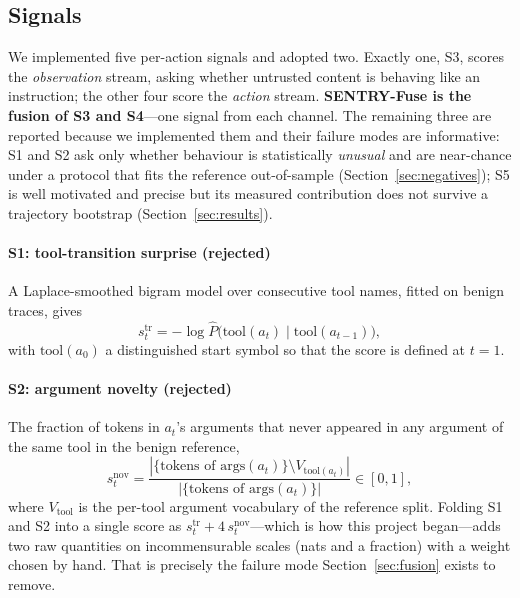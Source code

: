 \documentclass[preprint,12pt,authoryear]{elsarticle}
\theoremstyle{definition}
\begin{document}
\subsection{Signals}\label{sec:signals}

We implemented five per-action signals and adopted two. Exactly one, S3, scores the
\emph{observation} stream, asking whether untrusted content is behaving like an
instruction; the other four score the \emph{action} stream.
\textbf{SENTRY-Fuse is the fusion of S3 and S4}---one signal from each channel.
The remaining three are reported because we implemented them and their failure
modes are informative: S1 and S2 ask only whether behaviour is statistically \emph{unusual}
and are near-chance under a protocol that fits the reference out-of-sample
(Section~\ref{sec:negatives}); S5 is well motivated and precise but its measured
contribution does not survive a trajectory bootstrap (Section~\ref{sec:results}).

\paragraph{S1: tool-transition surprise (rejected)}
A Laplace-smoothed bigram model over consecutive tool names, fitted on benign
traces, gives
\begin{equation}
s^{\mathrm{tr}}_t = -\log \hat{P}\big(\mathrm{tool}(a_t) \mid \mathrm{tool}(a_{t-1})\big),
\end{equation}
with $\mathrm{tool}(a_0)$ a distinguished start symbol so that the score is
defined at $t=1$.

\paragraph{S2: argument novelty (rejected)}
The fraction of tokens in $a_t$'s arguments that never appeared in any argument of
the same tool in the benign reference,
\begin{equation}
s^{\mathrm{nov}}_t = \frac{|\{\text{tokens of } \mathrm{args}(a_t)\} \setminus
V_{\mathrm{tool}(a_t)}|}{|\{\text{tokens of } \mathrm{args}(a_t)\}|} \in [0,1],
\end{equation}
where $V_{\mathrm{tool}}$ is the per-tool argument vocabulary of the reference
split. Folding S1 and S2 into a single score as
$s^{\mathrm{tr}}_t + 4\,s^{\mathrm{nov}}_t$---which is how this project began---adds
two raw quantities on incommensurable scales (nats and a fraction) with a weight
chosen by hand. That
is precisely the failure mode Section~\ref{sec:fusion} exists to remove.
\end{document}
